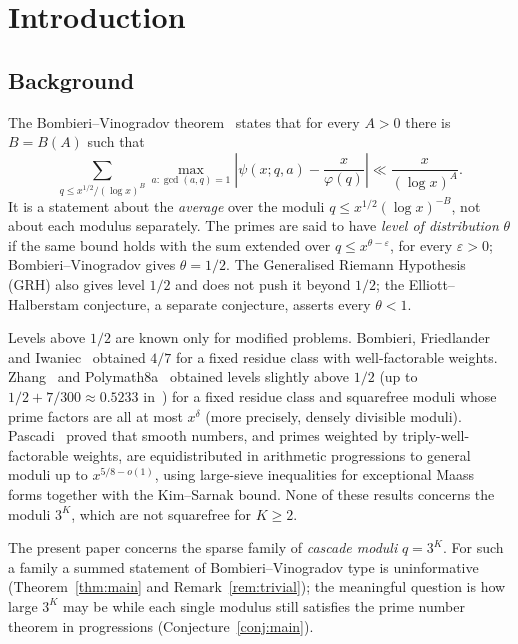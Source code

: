 \documentclass[12pt]{amsart}
\theoremstyle{plain}
\theoremstyle{definition}
\begin{document}
\tableofcontents

\section{Introduction}
\label{sec:intro}

\subsection{Background}

The Bombieri--Vinogradov theorem~\cite{Bombieri1965,Vinogradov1965} states
that for every $A > 0$ there is $B = B(A)$ such that
\[
  \sum_{q \leq x^{1/2}/(\log x)^B} \max_{a\colon \gcd(a,q)=1}
  \left|\psi(x;q,a) - \frac{x}{\varphi(q)}\right| \ll \frac{x}{(\log x)^A}.
\]
It is a statement about the \emph{average} over the moduli
$q \leq x^{1/2}(\log x)^{-B}$, not about each modulus separately. The primes
are said to have \emph{level of distribution} $\theta$ if the same bound
holds with the sum extended over $q \leq x^{\theta-\varepsilon}$, for every
$\varepsilon > 0$; Bombieri--Vinogradov gives $\theta = 1/2$. The Generalised
Riemann Hypothesis (GRH) also gives level $1/2$ and does not push it beyond
$1/2$; the Elliott--Halberstam conjecture, a separate conjecture, asserts
every $\theta < 1$.

Levels above $1/2$ are known only for modified problems. Bombieri,
Friedlander and Iwaniec~\cite{BFI1986} obtained $4/7$ for a fixed residue
class with well-factorable weights. Zhang~\cite{Zhang2014} and
Polymath8a~\cite{Polymath8a} obtained levels slightly above $1/2$ (up to
$1/2 + 7/300 \approx 0.5233$ in~\cite{Polymath8a}) for a fixed residue class
and squarefree moduli whose prime factors are all at most $x^\delta$ (more
precisely, densely divisible moduli). Pascadi~\cite{Pascadi2025} proved that
smooth numbers, and primes weighted by triply-well-factorable weights, are
equidistributed in arithmetic progressions to general moduli up to
$x^{5/8-o(1)}$, using large-sieve inequalities for exceptional Maass forms
together with the Kim--Sarnak bound. None of these results concerns the
moduli $3^K$, which are not squarefree for $K \geq 2$.

The present paper concerns the sparse family of \emph{cascade moduli}
$q = 3^K$. For such a family a summed statement of Bombieri--Vinogradov type
is uninformative (Theorem~\ref{thm:main} and Remark~\ref{rem:trivial}); the
meaningful question is how large $3^K$ may be while each single modulus
still satisfies the prime number theorem in progressions
(Conjecture~\ref{conj:main}).
\end{document}
